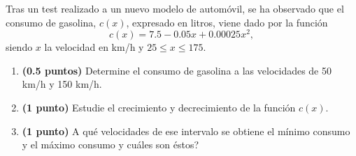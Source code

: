 
Tras un test realizado a un nuevo modelo de automóvil, se ha observado que el consumo de gasolina, $c(x)$, expresado en litros, viene dado por la función
\[
c(x)=7.5-0.05x+0.00025x^2,
\]
siendo $x$ la velocidad en km/h y $25\leq x\leq175$.
\begin{enumerate}[label=\alph*)]
\item \textbf{(0.5 puntos)} Determine el consumo de gasolina a las velocidades de 50 km/h y 150 km/h.
\item \textbf{(1 punto)} Estudie el crecimiento y decrecimiento de la función $c(x)$.
\item \textbf{(1 punto)} \textquestiondown{}A qué velocidades de ese intervalo se obtiene el mínimo consumo y el máximo consumo y cuáles son éstos?
\end{enumerate}
